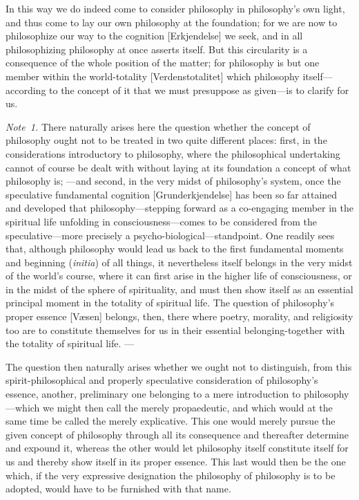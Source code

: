 \documentclass[12pt,a4paper]{book}
\begin{document}
In this way we do indeed come to consider philosophy in philosophy's own light,
and thus come to lay our own philosophy at the foundation; for we are now to
philosophize our way to the cognition [Erkjendelse] we seek, and in all
philosophizing philosophy at once asserts itself. But this circularity is a
consequence of the whole position of the matter; for philosophy is but one
member within the world-totality [Verdenstotalitet] which philosophy itself---%
according to the concept of it that we must presuppose as given---is to clarify
for us.

{\small\emph{Note~1.} There naturally arises here the question whether the
concept of philosophy ought not to be treated in two quite different places:
first, in the considerations introductory to philosophy, where the philosophical
undertaking cannot of course be dealt with without laying at its foundation a
concept of what philosophy is; ---and second, in the very midst of philosophy's
system, once the speculative fundamental cognition [Grunderkjendelse] has been so
far attained and developed that philosophy---stepping forward as a co-engaging
member in the spiritual life unfolding in consciousness---comes to be considered
from the speculative---more precisely a psycho-biological---standpoint. One
readily sees that, although philosophy would lead us back to the first
fundamental moments and beginning (\textit{initia}) of all things, it
nevertheless itself belongs in the very midst of the world's course, where it
can first arise in the higher life of consciousness, or in the midst of the
sphere of spirituality, and must then show itself as an essential principal
moment in the totality of spiritual life. The question of philosophy's proper
essence [Væsen] belongs, then, there where poetry, morality, and religiosity too
are to constitute themselves for us in their essential belonging-together with
the totality of spiritual life. ---\par}

{\small The question then naturally arises whether we ought not to distinguish,
from this spirit-philosophical and properly speculative consideration of
philosophy's essence, another, preliminary one belonging to a mere introduction
to philosophy---which we might then call the merely propaedeutic, and which would
at the same time be called the merely explicative. This one would merely pursue
the given concept of philosophy through all its consequence and thereafter
determine and expound it, whereas the other would let philosophy itself
constitute itself for us and thereby show itself in its proper essence. This last
would then be the one which, if the very expressive designation the philosophy of
philosophy is to be adopted, would have to be furnished with that name.\par}
\end{document}
